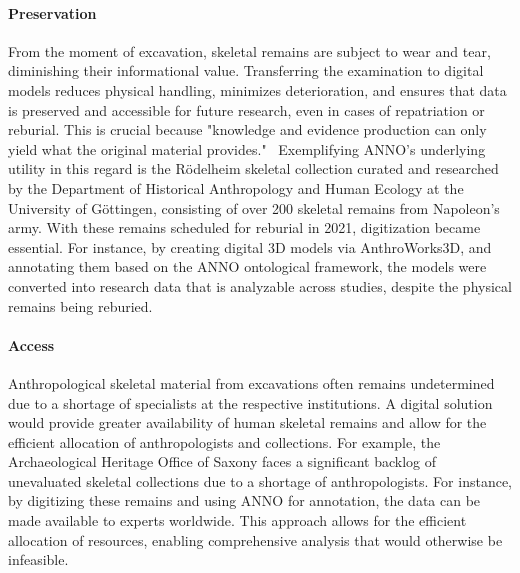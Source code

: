 \documentclass[sw]{iosart2x}
\begin{document}
\begin{enumerate}
\paragraph{Preservation}\label{sec:preserve}
From the moment of excavation, skeletal remains are subject to wear and tear, diminishing their informational value.
Transferring the examination to digital models reduces physical handling, minimizes deterioration, and ensures that data is preserved and accessible for future research, even in cases of repatriation or reburial.
This is crucial because "knowledge and evidence production can only yield what the original material provides."~\cite{HeuschkelSchmiedelLabudde2024}
Exemplifying ANNO's underlying utility in this regard is the Rödelheim skeletal collection curated and researched by the Department of Historical Anthropology and Human Ecology at the University of Göttingen, consisting of over 200 skeletal remains from Napoleon's army.
With these remains scheduled for reburial in 2021, digitization became essential.
For instance, by creating digital 3D models via AnthroWorks3D, and annotating them based on the ANNO ontological framework, the models were converted into research data that is analyzable across studies, despite the physical remains being reburied.

\paragraph{Access}\label{sec:access}
Anthropological skeletal material from excavations often remains undetermined due to a shortage of specialists at the respective institutions.
A digital solution would provide greater availability of human skeletal remains and allow for the efficient allocation of anthropologists and collections.
For example, the Archaeological Heritage Office of Saxony faces a significant backlog of unevaluated skeletal collections due to a shortage of anthropologists.
For instance, by digitizing these remains and using ANNO for annotation, the data can be made available to experts worldwide.
This approach allows for the efficient allocation of resources, enabling comprehensive analysis that would otherwise be infeasible.


\end{enumerate}
\end{document}
